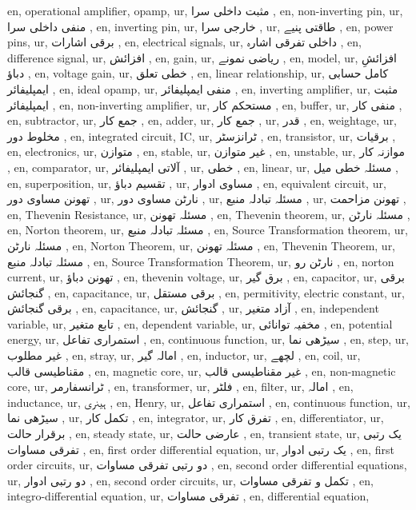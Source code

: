 en, operational amplifier, opamp,
ur, مثبت داخلی سرا ,
en, non-inverting pin,
ur, منفی داخلی سرا ,
en, inverting pin,
ur, خارجی سرا ,
ur, طاقتی پنیے ,
en, power pins,
ur, برقی اشارات ,
en, electrical signals,
ur, داخلی تفرقی اشارہ ,
en, difference signal,
ur, افزائش ,
en, gain,
ur, ریاضی نمونے ,
en, model,
ur, افزائشِ دباؤ ,
en, voltage gain,
ur, خطی تعلق ,
en, linear relationship,
ur, کامل حسابی ایمپلیفائر ,
en, ideal opamp,
ur, منفی ایمپلیفائر ,
en, inverting amplifier,
ur, مثبت ایمپلیفائر ,
en, non-inverting amplifier,
ur, مستحکم کار ,
en, buffer,
ur, منفی کار ,
en, subtractor,
ur, جمع کار ,
en, adder,
ur, جمع کار ,
ur, قدر ,
en, weightage,
ur, مخلوط دور ,
en, integrated circuit, IC,
ur, ٹرانزسٹر ,
en, transistor,
ur, برقیات ,
en, electronics,
ur, متوازن ,
en, stable,
ur, غیر متوازن ,
en, unstable,
ur, موازنہ کار ,
en, comparator,
ur, آلاتی ایمپلیفائر ,
ur, خطی ,
en, linear,
ur, مسئلہ خطی میل ,
en, superposition,
ur, تقسیم دباؤ ,
ur, مساوی ادوار ,
en, equivalent circuit,
ur, تھونن مساوی دور ,
ur, نارٹن مساوی دور ,
ur, مسئلہ تبادلہ منبع ,
ur, تھونن مزاحمت ,
en, Thevenin Resistance,
ur, مسئلہ تھونن ,
en, Thevenin theorem,
ur, مسئلہ نارٹن ,
en, Norton theorem,
ur, مسئلہ تبادلہ منبع ,
en, Source Transformation theorem,
ur, مسئلہ نارٹن ,
en, Norton Theorem,
ur, مسئلہ تھونن ,
en, Thevenin Theorem,
ur, مسئلہ تبادلہ منبع ,
en, Source Transformation Theorem,
ur, نارٹن رو ,
en, norton current,
ur, تھونن دباؤ ,
en, thevenin voltage,
ur, برق گیر ,
en, capacitor,
ur, برقی گنجائش ,
en, capacitance,
ur, برقی مستقل ,
en, permitivity, electric constant,
ur, برقی گنجائش ,
en, capacitance,
ur, گنجائش ,
ur, آزاد متغیر ,
en, independent variable,
ur, تابع متغیر ,
en, dependent variable,
ur, مخفیہ توانائی ,
en, potential energy,
ur, استمراری تفاعل ,
en, continuous function,
ur, سیڑھی نما ,
en, step,
ur, غیر مطلوب ,
en, stray,
ur, امالہ گیر ,
en, inductor,
ur, لچھے ,
en, coil,
ur, مقناطیسی قالب ,
en, magnetic core,
ur, غیر مقناطیسی قالب ,
en, non-magnetic core,
ur, ٹرانسفارمر ,
en, transformer,
ur, فلٹر ,
en, filter,
ur, امالہ ,
en, inductance,
ur, ہینری ,
en, Henry,
ur, استمراری تفاعل ,
en, continuous function,
ur, سیڑھی نما ,
ur, تکمل کار ,
en, integrator,
ur, تفرق کار ,
en, differentiator,
ur, برقرار حالت ,
en, steady state,
ur, عارضی حالت ,
en, transient state,
ur, یک رتبی تفرقی مساوات ,
en, first order differential equation,
ur, یک رتبی ادوار ,
en, first order circuits,
ur, دو رتبی تفرقی مساوات ,
en, second order differential equations,
ur, دو رتبی ادوار ,
en, second order circuits,
ur, تکمل و تفرقی مساوات ,
en, integro-differential equation,
ur, تفرقی مساوات ,
en, differential equation,
